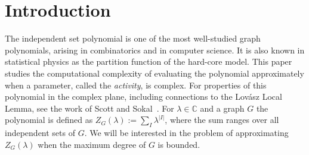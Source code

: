 \documentclass[11pt]{article}
\def\Complex{\mathbb{C}}
\begin{document}
\newpage



\clearpage
 \setcounter{page}{1}
\section{Introduction}

The independent set polynomial is one of the most well-studied graph polynomials, arising in combinatorics and in computer science. 
It is also known in statistical physics as the partition function of the hard-core  model.
This paper studies the computational complexity of evaluating the polynomial approximately 
when a parameter, called the \emph{activity}, is complex.
For properties of this polynomial  in the complex plane, including connections to the 
Lov\'asz Local Lemma, see the work of Scott and Sokal~\cite{SS}.
For $\lambda \in \Complex$ and a graph $G$ 
the polynomial is defined as $Z_G(\lambda):=\sum_{I}\lambda^{|I|}$, where the sum ranges over all independent sets of $G$.
We will be interested in the problem of approximating $Z_G(\lambda)$ when the
maximum degree of $G$ is bounded.
 
\end{document}
